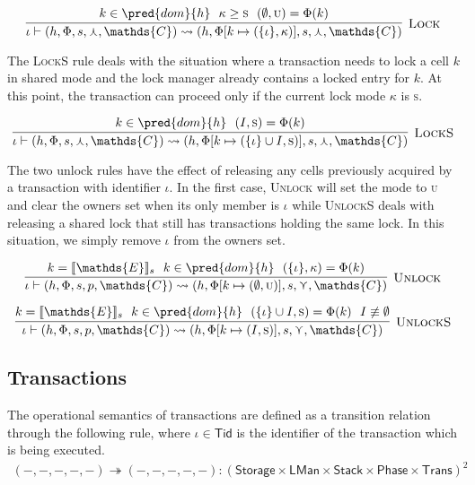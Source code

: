 \[
\infer[\textsc{Lock}]
{
	\iota \vdash (h, \Phi, s, \curlywedge, \mathds{C})
	\rightsquigarrow
	(h, \Phi[k \mapsto (\{\iota\}, \kappa)], s, \curlywedge, \mathds{C})
}
{
	k \in \pred{dom}{h}\ \
	\kappa \geq \textsc{s}\ \
	(\emptyset, \textsc{u}) = \Phi(k)
}
\]

The \textsc{LockS} rule deals with the situation where a transaction needs to lock a cell $k$ in shared mode and the lock manager already contains a locked entry for $k$. At this point, the transaction can proceed only if the current lock mode $\kappa$ is \textsc{s}.

\[
\infer[\textsc{LockS}]
{
	\iota \vdash (h, \Phi, s, \curlywedge, \mathds{C})
	\rightsquigarrow
	(h, \Phi[k \mapsto (\{\iota\} \cup I, \textsc{s})], s, \curlywedge, \mathds{C})
}
{
	k \in \pred{dom}{h}\ \
	(I, \textsc{s}) = \Phi(k)
}
\]

The two unlock rules have the effect of releasing any cells previously acquired by a transaction with identifier $\iota$. In the first case, \textsc{Unlock} will set the mode to \textsc{u} and clear the owners set when its only member is $\iota$ while \textsc{UnlockS} deals with releasing a shared lock that still has transactions holding the same lock. In this situation, we simply remove $\iota$ from the owners set.

\[
\infer[\textsc{Unlock}]
{
	\iota \vdash (h, \Phi, s, p, \mathds{C})
	\rightsquigarrow
	(h, \Phi[k \mapsto (\emptyset, \textsc{u})], s, \curlyvee, \mathds{C})
}
{
	k = \llbracket \mathds{E} \rrbracket_s\ \
	k \in \pred{dom}{h}\ \
	(\{\iota\}, \kappa) = \Phi(k)
}
\]

\[
\infer[\textsc{UnlockS}]
{
	\iota \vdash (h, \Phi, s, p, \mathds{C})
	\rightsquigarrow
	(h, \Phi[k \mapsto (I, \textsc{s})], s, \curlyvee, \mathds{C})
}
{
	k = \llbracket \mathds{E} \rrbracket_s\ \
	k \in \pred{dom}{h}\ \
	(\{\iota\} \cup I, \textsc{s}) = \Phi(k)\ \
	I \not\equiv \emptyset
}
\]

\subsection{Transactions}
The operational semantics of transactions are defined as a transition relation through the following rule, where $\iota \in \mathsf{Tid}$ is the identifier of the transaction which is being executed.
\begin{gather*}
(-, -, -, -, -) \twoheadrightarrow (-, -, -, -, -) : (\mathsf{Storage} \times \mathsf{LMan} \times \mathsf{Stack} \times \mathsf{Phase} \times \mathsf{Trans})^2
\end{gather*}

